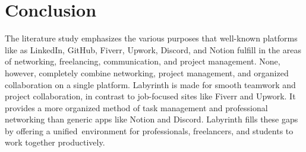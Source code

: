 \documentclass{FastFyp}
\begin{document}
\section{Conclusion}
The literature study emphasizes the various purposes that well-known platforms like as LinkedIn, GitHub, Fiverr, Upwork, Discord, and Notion fulfill in the areas of networking, freelancing, communication, and project management. None, however, completely combine networking, project management, and organized collaboration on a single platform. Labyrinth is made for smooth teamwork and project collaboration, in contrast to job-focused sites like Fiverr and Upwork. It provides a more organized method of task management and professional networking than generic apps like Notion and Discord. Labyrinth fills these gaps by offering a unified environment for professionals, freelancers, and students to work together productively.
\end{document}
